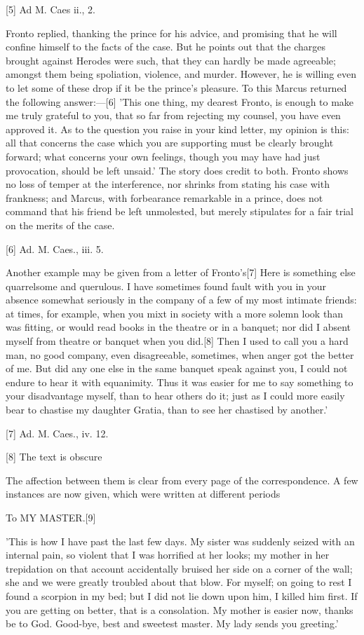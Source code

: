[5]
Ad M. Caes ii., 2.

Fronto replied, thanking the prince for his advice, and promising that he
will confine himself to the facts of the case. But he points out that the
charges brought against Herodes were such, that they can hardly be made
agreeable; amongst them being spoliation, violence, and murder. However,
he is willing even to let some of these drop if it be the prince's
pleasure. To this Marcus returned the following answer:—[6]
'This one thing, my dearest Fronto, is enough to make me truly grateful
to you, that so far from rejecting my counsel, you have even approved it.
As to the question you raise in your kind letter, my opinion is this: all
that concerns the case which you are supporting must be clearly brought
forward; what concerns your own feelings, though you may have had just
provocation, should be left unsaid.' The story does credit to both.
Fronto shows no loss of temper at the interference, nor shrinks from
stating his case with frankness; and Marcus, with forbearance remarkable
in a prince, does not command that his friend be left unmolested, but
merely stipulates for a fair trial on the merits of the case.

[6]
Ad. M. Caes., iii. 5.

Another example may be given from a letter of Fronto's[7]
Here is something else quarrelsome and querulous. I have sometimes found
fault with you in your absence somewhat seriously in the company of a few
of my most intimate friends: at times, for example, when you mixt in
society with a more solemn look than was fitting, or would read books in
the theatre or in a banquet; nor did I absent myself from theatre or
banquet when you did.[8]
Then I used to call you a hard man, no good company, even disagreeable,
sometimes, when anger got the better of me. But did any one else in the
same banquet speak against you, I could not endure to hear it with
equanimity. Thus it was easier for me to say something to your
disadvantage myself, than to hear others do it; just as I could more
easily bear to chastise my daughter Gratia, than to see her chastised by
another.'

[7]
Ad. M. Caes., iv. 12.

[8]
The text is obscure

The affection between them is clear from every page of the correspondence.
A few instances are now given, which were written at different periods

To MY MASTER.[9]

'This is how I have past the last few days. My sister was suddenly seized
with an internal pain, so violent that I was horrified at her looks; my
mother in her trepidation on that account accidentally bruised her side
on a corner of the wall; she and we were greatly troubled about that
blow. For myself; on going to rest I found a scorpion in my bed; but I
did not lie down upon him, I killed him first. If you are getting on
better, that is a consolation. My mother is easier now, thanks be to God.
Good-bye, best and sweetest master. My lady sends you greeting.'

